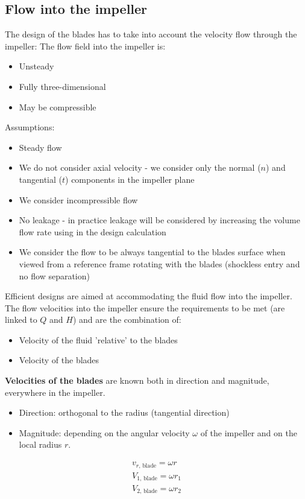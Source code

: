 \subsection{Flow into the impeller}
The design of the blades has  to take into account the velocity flow through the impeller: The flow field into the impeller is:
\begin{itemize}
  \item Unsteady
  \item Fully three-dimensional
  \item May be compressible
\end{itemize}
Assumptions:
\begin{itemize}
  \item Steady flow
  \item We do not consider axial velocity - we consider only the normal ($n$) and tangential ($t$) components in the impeller plane
  \item We consider incompressible flow
  \item No leakage - in practice leakage will be considered by increasing the volume flow rate using in the design calculation
  \item We consider the flow to be always tangential to the blades surface when viewed from a reference frame rotating with the blades (shockless entry and no flow separation)
\end{itemize}
Efficient designs are aimed at accommodating the fluid flow into the impeller. The flow velocities into the impeller ensure the requirements to be met (are linked to $Q$ and $H$) and are the combination of:
\begin{itemize}
  \item Velocity of the fluid 'relative' to the blades
  \item Velocity of the blades
\end{itemize}
\textbf{Velocities of the blades} are known both in direction and magnitude, everywhere in the impeller.
\begin{itemize}
  \item Direction: orthogonal to the radius (tangential direction)
  \item Magnitude: depending on the angular velocity $\omega$ of the impeller and on the local radius $r$.
\end{itemize}
\begin{gather}
  v_{r \textrm{, blade}} = \omega r\\
  V_{1 \textrm{, blade}} = \omega r_1\\
  V_{2 \textrm{, blade}} = \omega r_2\\
\end{gather}
